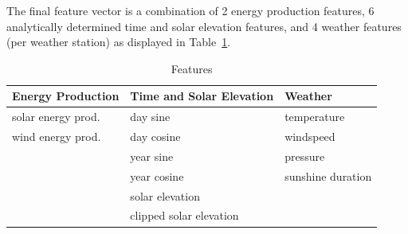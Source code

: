 \documentclass[11pt,table]{article}
\begin{document}
The final feature vector is a combination of 2 energy production features, 6 analytically determined time and solar elevation features, and 4 weather features (per weather station) as displayed in Table~\ref{tab:features}.

\begin{table}[H]
\begin{center}
\begin{tabular}{p{4.5cm}|p{5cm}|p{4.5cm}}
\toprule
\textbf{Energy Production} & \textbf{Time and Solar Elevation} & \textbf{Weather}              \\
\midrule
solar energy prod. & day sine                 & temperature          \\
wind energy prod.  & day cosine               & windspeed            \\
                   & year sine                & pressure             \\
                   & year cosine              & sunshine duration    \\
                   & solar elevation          &                      \\
                   & clipped solar elevation  &                     \\ \bottomrule
\end{tabular}
\end{center}
\caption{Features}
\label{tab:features}
\end{table}
\end{document}
